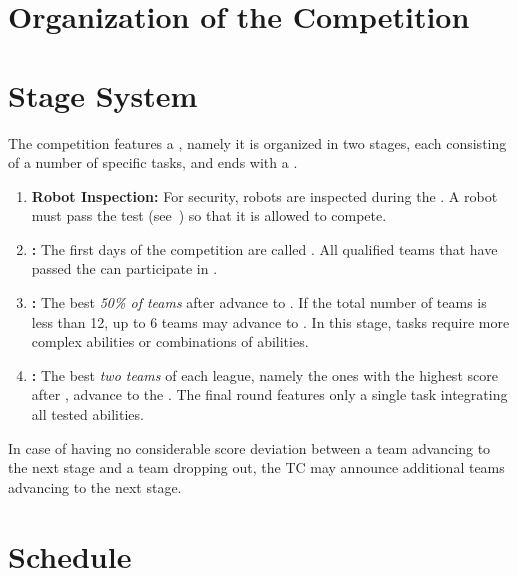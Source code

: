 \section{Organization of the Competition}
\label{sec:procedure_during_competition}

\section{Stage System}\label{rule:stages}

The competition features a , namely it is organized in two stages, each consisting of a number of specific tasks, and ends with a \FINAL.
\begin{enumerate}
	\item \textbf{Robot Inspection:} For security, robots are inspected during the \SetupDays.
	A robot must pass the \RobotInspection{} test (see~) so that it is allowed to compete.

	\item \textbf{\SONE:} The first days of the competition are called \SONE.
	All qualified teams that have passed the \RobotInspection{} can participate in \SONE.


	\item \textbf{\STWO:} The best \emph{50\% of teams} after \SONE{} advance to \STWO. If the total number of teams is less than 12, up to 6 teams may advance to \STWO.
	In this stage, tasks require more complex abilities or combinations of abilities.

	\item \textbf{\FINAL:} The best \emph{two teams} of each league, namely the ones with the highest score after \STWO, advance to the \FINAL.
	The final round features only a single task integrating all tested abilities.

\end{enumerate}
In case of having no considerable score deviation between a team advancing to the next stage and a team dropping out, the TC may announce additional teams advancing to the next stage.


\section{Schedule}
\label{rule:schedule}

